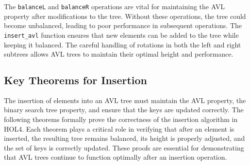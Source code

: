 \documentclass[12pt]{article}
\begin{document}
The \texttt{balanceL} and \texttt{balanceR} operations are vital for maintaining the AVL property after modifications to the tree. Without these operations, the tree could become unbalanced, leading to poor performance in subsequent operations. The \texttt{insert\_avl} function ensures that new elements can be added to the tree while keeping it balanced. The careful handling of rotations in both the left and right subtrees allows AVL trees to maintain their optimal height and performance.


\subsection{Key Theorems for Insertion}

The insertion of elements into an AVL tree must maintain the AVL property, the binary search tree property, and ensure that the keys are updated correctly. The following theorems formally prove the correctness of the insertion algorithm in HOL4. Each theorem plays a critical role in verifying that after an element is inserted, the resulting tree remains balanced, its height is properly adjusted, and the set of keys is correctly updated. These proofs are essential for demonstrating that AVL trees continue to function optimally after an insertion operation.
\end{document}

